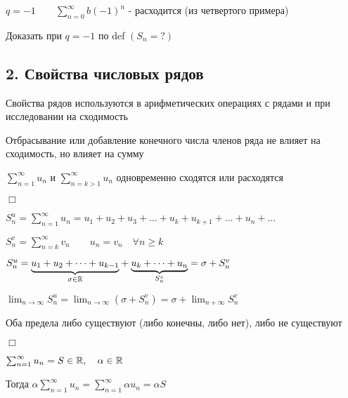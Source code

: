 \documentclass[12pt]{article}
\begin{document}
    $q = -1 \quad\quad \sum_{n = 0}^\infty b (-1)^n$ - расходится (из четвертого примера)

    \Lab Доказать при $q = -1$ по def $(S_n = ?)$\

    \hypertarget{seriesproperties}{}

    \subsection{2. Свойства числовых рядов}

    \Notas Свойства рядов используются в арифметических операциях с рядами и при исследовании на сходимость

    \begin{MyTheorem}
         Отбрасывание или добавление конечного числа членов ряда не влияет на сходимость, но влияет на сумму

        $\sum_{n = 1}^\infty u_n$ и $\sum_{n = k > 1}^\infty u_n$ одновременно сходятся или расходятся
    \end{MyTheorem}

    \begin{tcolorbox}
        $\Box$

        $S^u_n = \sum_{n = 1}^{\infty} u_n = u_1 + u_2 + u_3 + \dots + u_k + u_{k + 1} + \dots + u_n + \dots$

        $S^v_n = \sum_{n = k}^\infty v_n \quad\quad u_n = v_n \quad \forall n \geq k$

        $S_n^u = \underset{\sigma \in \mathbb{R}}{\underbrace{u_1 + u_2 + \dots + u_{k - 1}}} + \underset{S^v_n}{\underbrace{u_{k} + \dots + u_n}} = \sigma + S^v_n$

        $\lim_{n \to \infty} S_n^u = \lim_{n \to \infty} (\sigma + S^v_n) = \sigma + \lim_{n + \infty} S_n^v$

        \smallvspace

        Оба предела либо существуют (либо конечны, либо нет), либо не существуют



        $\Box$
    \end{tcolorbox}

    \begin{MyTheorem}
         $\sum_{n = 1}^\infty u_n = S \in \mathbb{R}, \quad \alpha \in \mathbb{R}$

        Тогда $\alpha \sum_{n = 1}^\infty u_n = \sum_{n = 1}^\infty \alpha u_n = \alpha S$
    \end{MyTheorem}
\end{document}
